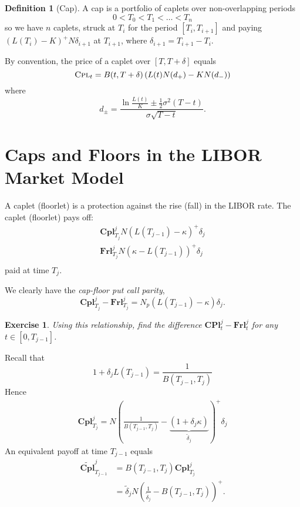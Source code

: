 \documentclass[10pt, oneside, reqno]{amsbook}
\theoremstyle{plain}%
\newtheorem{exer}[thm]{Exercise}
\theoremstyle{definition}
\newtheorem{defn}[thm]{Definition}
\theoremstyle{remark}
\numberwithin{equation}{chapter}
\begin{document}
\begin{defn}[Cap]
	 A cap is a portfolio of caplets over non-overlapping periods \[
	 	0 < T_0 < T_1 < \dots < T_n 
	 \] so we have $n$ caplets, struck at $T_{i}$ for the period $[T_i, T_{i+1}]$ and paying $(L(T_i) - K)^+ N \delta_{i+1}$ at $T_{i+1}$, where $\delta_{i+1} = T_{i+1} - T_i$.
\end{defn}


By convention, the price of a caplet over $[T, T+\delta]$ equals \[
	\textsc{Cpl}_t = B(t, T+\delta) \left( L(t) N(d_+) - KN(d_-)\right)
\] where \[
	d_\pm = \frac{\ln \frac{L(t)}{K} \pm \frac{1}{2} \sigma^2(T-t)}{\sigma \sqrt{T-t}}.
\]


  

\section{Caps and Floors in the LIBOR Market Model} %
\label{sec:caps_and_floors_in_the_libor_market_model}

A caplet (floorlet) is a protection against the rise (fall) in the LIBOR rate. The caplet (floorlet) pays off: \begin{align*}
 	\mathbf{Cpl}^j_{T_j} 	N\left( L(T_{j-1}) - \kappa\right)^+ \delta_j \\
	\mathbf{Frl}^j_{T_j} 	N\left(  \kappa - L(T_{j-1}) \right)^+ \delta_j \\
\end{align*} paid at time $T_j$.  

We clearly have the \emph{cap-floor put call parity}, \[
	\mathbf{Cpl}^j_{T_j} - \mathbf{Frl}^j_{T_j} = N_p \left(L(T_{j-1}) - \kappa \right) \delta_j. 
\]  

\begin{exer}
	Using this relationship, find the difference $\mathbf{CPl}_t^j - \mathbf{Frl}^j_t$ for any $t \in [0, T_{j-1}]$.
\end{exer}

Recall that \[
	1 + \delta_j L(T_{j-1}) = \frac{1}{B(T_{j-1}, T_j)}
\]  Hence \begin{align*}
	\mathbf{Cpl}^j_{T_j} = N \left( \frac{1}{B(T_{j-1}, T_j)} - \underbrace{(1 + \delta_j \kappa)}_{\tilde \delta_j} \right)^+ \delta_j
\end{align*}  An equivalent payoff at time $T_{j-1}$ equals \begin{align*}
	\tilde{\mathbf{Cpl}}^j_{T_{j-1}} &= B(T_{j-1}, T_j) \mathbf{Cpl}_{T_j}^j \\
				&= \tilde \delta_j N \left( \frac{1}{\tilde \delta_j} - B(T_{j-1}, T_j) \right)^+.
\end{align*}
\end{document}
